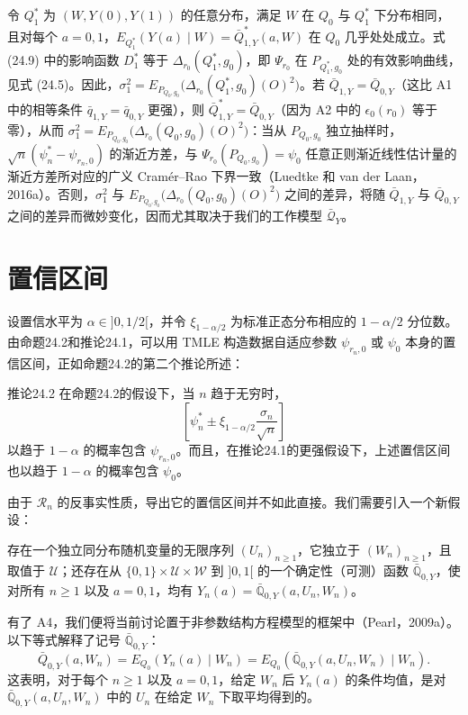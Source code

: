 令 $Q_1^*$ 为 $(W,Y(0),Y(1))$ 的任意分布，满足 $W$ 在 $Q_0$ 与 $Q_1^*$ 下分布相同，且对每个 $a=0,1$，$E_{Q_1^*}(Y(a)\mid W)=\bar Q_{1,Y}^*(a,W)$ 在 $Q_0$ 几乎处处成立。式 (24.9) 中的影响函数 $D_1^*$ 等于 $\Delta_{r_0}(Q_1^*,g_0)$，即 $\Psi_{r_0}$ 在 $P_{Q_1^*,g_0}$ 处的有效影响曲线，见式 (24.5)。因此，$\sigma_1^2=E_{P_{Q_0,g_0}}\bigl(\Delta_{r_0}(Q_1^*,g_0)(O)^2\bigr)$。若 $\bar Q_{1,Y}=\bar Q_{0,Y}$（这比 A1 中的相等条件 $\bar q_{1,Y}=\bar q_{0,Y}$ 更强），则 $\bar Q_{1,Y}^*=\bar Q_{0,Y}$（因为 A2 中的 $\epsilon_0(r_0)$ 等于零），从而 $\sigma_1^2=E_{P_{Q_0,g_0}}\bigl(\Delta_{r_0}(Q_0,g_0)(O)^2\bigr)$：当从 $P_{Q_0,g_0}$ 独立抽样时，$\sqrt n(\psi_n^*-\psi_{r_n,0})$ 的渐近方差，与 $\Psi_{r_0}(P_{Q_0,g_0})=\psi_0$ 任意正则渐近线性估计量的渐近方差所对应的广义 Cramér--Rao 下界一致（Luedtke 和 van der Laan，2016a）。否则，$\sigma_1^2$ 与 $E_{P_{Q_0,g_0}}\bigl(\Delta_{r_0}(Q_0,g_0)(O)^2\bigr)$ 之间的差异，将随 $\bar Q_{1,Y}$ 与 $\bar Q_{0,Y}$ 之间的差异而微妙变化，因而尤其取决于我们的工作模型 $\bar{\mathcal Q}_Y$。

\section{置信区间}

设置信水平为 $\alpha\in]0,1/2[$，并令 $\xi_{1-\alpha/2}$ 为标准正态分布相应的 $1-\alpha/2$ 分位数。由命题24.2和推论24.1，可以用 TMLE 构造数据自适应参数 $\psi_{r_n,0}$ 或 $\psi_0$ 本身的置信区间，正如命题24.2的第二个推论所述：

\begin{bookresult}{推论}{24.2}
在命题24.2的假设下，当 $n$ 趋于无穷时，
\begin{equation}
 \left[\psi_n^*\pm\xi_{1-\alpha/2}\frac{\sigma_n}{\sqrt n}\right]
 \tag{24.10}
\end{equation}
以趋于 $1-\alpha$ 的概率包含 $\psi_{r_n,0}$。而且，在推论24.1的更强假设下，上述置信区间也以趋于 $1-\alpha$ 的概率包含 $\psi_0$。
\end{bookresult}

由于 $\mathcal R_n$ 的反事实性质，导出它的置信区间并不如此直接。我们需要引入一个新假设：
\begin{description}[leftmargin=3em,labelwidth=2.5em]
\item[A4.] 存在一个独立同分布随机变量的无限序列 $(U_n)_{n\geq1}$，它独立于 $(W_n)_{n\geq1}$，且取值于 $\mathcal U$；还存在从 $\{0,1\}\times\mathcal U\times\mathcal W$ 到 $]0,1[$ 的一个确定性（可测）函数 $\bar{\mathbb Q}_{0,Y}$，使对所有 $n\geq1$ 以及 $a=0,1$，均有 $Y_n(a)=\bar{\mathbb Q}_{0,Y}(a,U_n,W_n)$。
\end{description}
有了 A4，我们便将当前讨论置于非参数结构方程模型的框架中（Pearl，2009a）。以下等式解释了记号 $\bar{\mathbb Q}_{0,Y}$：
\[
 \bar Q_{0,Y}(a,W_n)=E_{Q_0}(Y_n(a)\mid W_n)
 =E_{Q_0}(\bar{\mathbb Q}_{0,Y}(a,U_n,W_n)\mid W_n).
\]
这表明，对于每个 $n\geq1$ 以及 $a=0,1$，给定 $W_n$ 后 $Y_n(a)$ 的条件均值，是对 $\bar{\mathbb Q}_{0,Y}(a,U_n,W_n)$ 中的 $U_n$ 在给定 $W_n$ 下取平均得到的。

